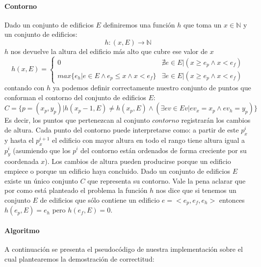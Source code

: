 \paragraph{Contorno}
Dado un conjunto de edificios $E$ definiremos una función $h$ que toma un $x \in \mathbb{N}$ y un conjunto de edificios:
\begin{displaymath}
	h: (x,E) \to \mathbb{N} 
\end{displaymath}
$h$ nos devuelve la altura del edificio más alto que cubre ese valor de $x$ 
\begin{displaymath}
	h(x, E) = \begin{cases} 
						0 & \nexists e \in E | (x \geq e_p \land x < e_f) \\
						max\{ e_h | e \in E  \land e_p \leq x \land x < e_f \} & \exists e \in E | (x \geq e_p \land x < e_f)
				\end{cases} %
\end{displaymath}
contando con $h$ ya podemos definir correctamente nuestro conjunto de puntos que conforman el contorno del
conjunto de edificios $E$:
\begin{displaymath}
	C = \{ p = (x_p, y_p) | h(x_p - 1, E) \neq h(x_p, E) \land (\exists ev \in Ev | ev_x = x_p \land ev_h = y_p) \}
\end{displaymath}
Es decir, los puntos que pertenezcan al conjunto $contorno$ registrarán los cambios de altura. Cada punto
del contorno puede interpretarse como: a partir de este $p_x^i$ y hasta el $p_x^{i+1}$ el edificio con mayor
altura en todo el rango tiene altura igual a $p_y^i$ (asumiendo que los $p^i$ del contorno están ordenados
de forma creciente por su coordenada $x$). Los cambios de altura pueden producirse
porque un edificio empiece o porque un edificio haya concluido. 
Dado un conjunto de edificios $E$ existe un único conjunto $C$ que representa su contorno. 
Vale la pena aclarar que por como está planteado el problema la función $h$ nos dice que si tenemos un conjunto $E$
de edificios que sólo contiene un edificio $e = <e_p, e_f, e_h>$ entonces $h(e_p, E) = e_h$ pero $h(e_f, E) = 0$.

\paragraph{Algoritmo} 
A continuación se presenta el pseudocódigo de nuestra implementación sobre el cual plantearemos la
demostración de correctitud:

